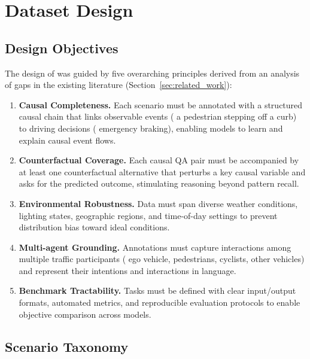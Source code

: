 \section{Dataset Design}
\label{sec:design}

\subsection{Design Objectives}
\label{ssec:design_objectives}

The design of \lucid{} was guided by five overarching principles derived from
an analysis of gaps in the existing literature (Section~\ref{sec:related_work}):

\begin{enumerate}[leftmargin=2em, noitemsep, label=\textbf{P\arabic*.}]
  \item \textbf{Causal Completeness.} Each scenario must be annotated with a
        structured causal chain that links observable events (\eg{} a pedestrian
        stepping off a curb) to driving decisions (\eg{} emergency braking),
        enabling models to learn and explain causal event flows.
  \item \textbf{Counterfactual Coverage.} Each causal QA pair must be accompanied
        by at least one counterfactual alternative that perturbs a key causal
        variable and asks for the predicted outcome, stimulating reasoning beyond
        pattern recall.
  \item \textbf{Environmental Robustness.} Data must span diverse weather conditions,
        lighting states, geographic regions, and time-of-day settings to prevent
        distribution bias toward ideal conditions.
  \item \textbf{Multi-agent Grounding.} Annotations must capture interactions among
        multiple traffic participants (\eg{} ego vehicle, pedestrians, cyclists, other
        vehicles) and represent their intentions and interactions in language.
  \item \textbf{Benchmark Tractability.} Tasks must be defined with clear input/output
        formats, automated metrics, and reproducible evaluation protocols to enable
        objective comparison across models.
\end{enumerate}

\subsection{Scenario Taxonomy}
\label{ssec:scenario_taxonomy}

